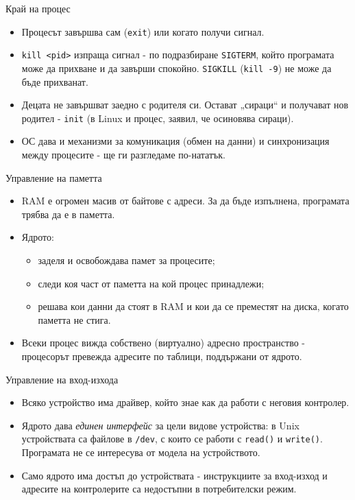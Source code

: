 \documentclass[14pt, aspectratio=169]{beamer}
\begin{document}
\begin{frame}{Край на процес}
  \begin{itemize}
    \item Процесът завършва сам (\texttt{exit}) или когато получи сигнал.
    \item \texttt{kill <pid>} изпраща сигнал - по подразбиране
      \texttt{SIGTERM}, който програмата може да прихване и да завърши
      спокойно. \texttt{SIGKILL} (\texttt{kill -9}) не може да бъде прихванат.
    \item Децата не завършват заедно с родителя си. Остават „сираци“ и
      получават нов родител - \texttt{init} (в Linux и процес, заявил, че
      осиновява сираци).
    \item ОС дава и механизми за комуникация (обмен на данни) и синхронизация
      между процесите - ще ги разгледаме по-нататък.
  \end{itemize}
\end{frame}

\begin{frame}{Управление на паметта}
  \begin{itemize}
    \item RAM е огромен масив от байтове с адреси. За да бъде изпълнена,
      програмата трябва да е в паметта.
    \item Ядрото:
      \begin{itemize}
        \item заделя и освобождава памет за процесите;
        \item следи коя част от паметта на кой процес принадлежи;
        \item решава кои данни да стоят в RAM и кои да се преместят на диска,
          когато паметта не стига.
      \end{itemize}
    \item Всеки процес вижда собствено (виртуално) адресно пространство -
      процесорът превежда адресите по таблици, поддържани от ядрото.
  \end{itemize}
\end{frame}

\begin{frame}{Управление на вход-изхода}
  \begin{itemize}
    \item Всяко устройство има драйвер, който знае как да работи с неговия
      контролер.
    \item Ядрото дава \emph{единен интерфейс} за цели видове устройства: в
      Unix устройствата са файлове в \texttt{/dev}, с които се работи с
      \texttt{read()} и \texttt{write()}. Програмата не се интересува от
      модела на устройството.
    \item Само ядрото има достъп до устройствата - инструкциите за вход-изход
      и адресите на контролерите са недостъпни в потребителски режим.
  \end{itemize}
\end{frame}
\end{document}
